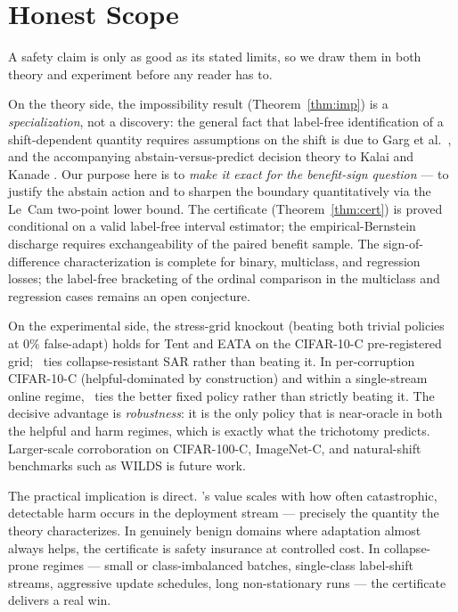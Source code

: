 \section{Honest Scope}\label{sec:intro-scope}

A safety claim is only as good as its stated limits, so we draw them in both
theory and experiment before any reader has to.

On the theory side, the impossibility result (Theorem~\ref{thm:imp}) is a
\emph{specialization}, not a discovery: the general fact that label-free
identification of a shift-dependent quantity requires assumptions on the shift is
due to Garg et al.\ \cite{garg2022atc}, and the accompanying abstain-versus-predict
decision theory to Kalai and Kanade \cite{kalai2021abstain}. Our purpose here is to
\emph{make it exact for the benefit-sign question} --- to justify the abstain action
and to sharpen the boundary quantitatively via the Le~Cam two-point lower bound.
The certificate (Theorem~\ref{thm:cert}) is proved conditional on a valid
label-free interval estimator; the empirical-Bernstein discharge requires
exchangeability of the paired benefit sample.
The sign-of-difference characterization is complete for binary, multiclass,
and regression losses; the label-free bracketing of the ordinal comparison
in the multiclass and regression cases remains an open conjecture.

On the experimental side, the stress-grid knockout (beating both trivial
policies at $0\%$ false-adapt) holds for Tent and EATA on the CIFAR-10-C
pre-registered grid; \KGA\ ties collapse-resistant SAR rather than beating
it.
In per-corruption CIFAR-10-C (helpful-dominated by construction) and within
a single-stream online regime, \KGA\ ties the better fixed policy rather
than strictly beating it.
The decisive advantage is \emph{robustness}: it is the only policy that is
near-oracle in both the helpful and harm regimes, which is exactly what
the trichotomy predicts.
Larger-scale corroboration on CIFAR-100-C, ImageNet-C, and natural-shift
benchmarks such as WILDS \cite{koh2021wilds} is future work.

The practical implication is direct.
\KGA's value scales with how often catastrophic, detectable harm occurs in
the deployment stream --- precisely the quantity the theory characterizes.
In genuinely benign domains where adaptation almost always helps, the
certificate is safety insurance at controlled cost.
In collapse-prone regimes --- small or class-imbalanced batches,
single-class label-shift streams, aggressive update schedules, long
non-stationary runs --- the certificate delivers a real win.

